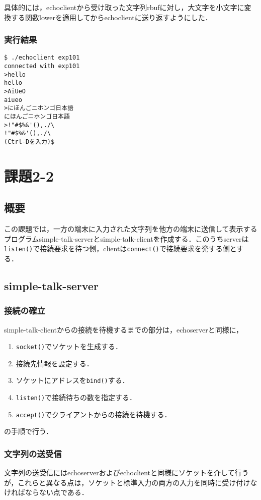 \documentclass[a4j,10pt,titlepage]{jsarticle}
\begin{document}
具体的には，echoclientから受け取った文字列rbufに対し，大文字を小文字に変換する関数lowerを適用してからechoclientに送り返すようにした．

\subsubsection{実行結果}
\begin{verbatim}
$ ./echoclient exp101
connected with exp101
>hello
hello
>AiUeO
aiueo
>にほんごニホンゴ日本語
にほんごニホンゴ日本語
>!"#$%&'(),./\
!"#$%&'(),./\
(Ctrl-Dを入力)$
\end{verbatim}

\section{課題2-2}
\subsection{概要}
この課題では，一方の端末に入力された文字列を他方の端末に送信して表示するプログラムsimple-talk-serverとsimple-talk-clientを作成する．このうちserverは\verb|listen()|で接続要求を待つ側，clientは\verb|connect()|で接続要求を発する側とする．

\subsection{simple-talk-server}
\subsubsection{接続の確立}
simple-talk-clientからの接続を待機するまでの部分は，echoserverと同様に，
\begin{enumerate}
	\item \verb|socket()|でソケットを生成する．
	\item 接続先情報を設定する．
	\item ソケットにアドレスを\verb|bind()|する．
	\item \verb|listen()|で接続待ちの数を指定する．
	\item \verb|accept()|でクライアントからの接続を待機する．
\end{enumerate}
の手順で行う．

\subsubsection{文字列の送受信}
文字列の送受信にはechoserverおよびechoclientと同様にソケットを介して行うが，これらと異なる点は，ソケットと標準入力の両方の入力を同時に受け付けなければならない点である．
\end{document}
